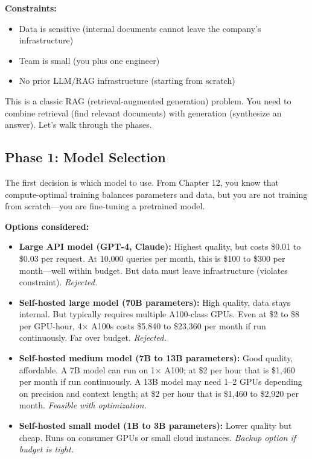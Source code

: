 \textbf{Constraints:}
\begin{itemize}
\item Data is sensitive (internal documents cannot leave the company's infrastructure)
\item Team is small (you plus one engineer)
\item No prior LLM/RAG infrastructure (starting from scratch)
\end{itemize}

This is a classic RAG (retrieval-augmented generation) problem. You need to combine retrieval (find relevant documents) with generation (synthesize an answer). Let's walk through the phases.

\vspace{1em}

\subsection{Phase 1: Model Selection}

The first decision is which model to use. From Chapter 12, you know that compute-optimal training balances parameters and data, but you are not training from scratch---you are fine-tuning a pretrained model.

\textbf{Options considered:}

\begin{itemize}
\item \textbf{Large API model (GPT-4, Claude):} Highest quality, but costs \$0.01 to \$0.03 per request. At 10,000 queries per month, this is \$100 to \$300 per month---well within budget. But data must leave infrastructure (violates constraint). \textit{Rejected.}

\item \textbf{Self-hosted large model (70B parameters):} High quality, data stays internal. But typically requires multiple A100-class GPUs. Even at \$2 to \$8 per GPU-hour, 4$\times$ A100s costs \$5,840 to \$23,360 per month if run continuously. Far over budget. \textit{Rejected.}

\item \textbf{Self-hosted medium model (7B to 13B parameters):} Good quality, affordable. A 7B model can run on 1$\times$ A100; at \$2 per hour that is \$1,460 per month if run continuously. A 13B model may need 1--2 GPUs depending on precision and context length; at \$2 per hour that is \$1,460 to \$2,920 per month. \textit{Feasible with optimization.}

\item \textbf{Self-hosted small model (1B to 3B parameters):} Lower quality but cheap. Runs on consumer GPUs or small cloud instances. \textit{Backup option if budget is tight.}
\end{itemize}

